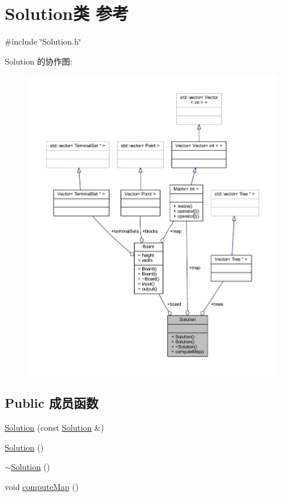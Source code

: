 \hypertarget{classSolution}{}\section{Solution类 参考}
\label{classSolution}


{\ttfamily \#include \char`\"{}Solution.\+h\char`\"{}}



Solution 的协作图\+:
\nopagebreak
\begin{figure}[H]
\begin{center}
\leavevmode
\includegraphics[width=350pt]{classSolution__coll__graph}
\end{center}
\end{figure}
\subsection*{Public 成员函数}
\begin{DoxyCompactItemize}
\item 
\hyperlink{classSolution_ae476d795607d0cc25347480be20a39c7}{Solution} (const \hyperlink{classSolution}{Solution} \&)
\item 
\hyperlink{classSolution_ab55bd4b023d596ce11aaf737b9a6123b}{Solution} ()
\item 
\hyperlink{classSolution_a5d245f7409aacf6ace5e965b7879a580}{$\sim$\+Solution} ()
\item 
void \hyperlink{classSolution_a45e5ef985917b725347a0742fe887400}{compute\+Map} ()
\end{DoxyCompactItemize}
